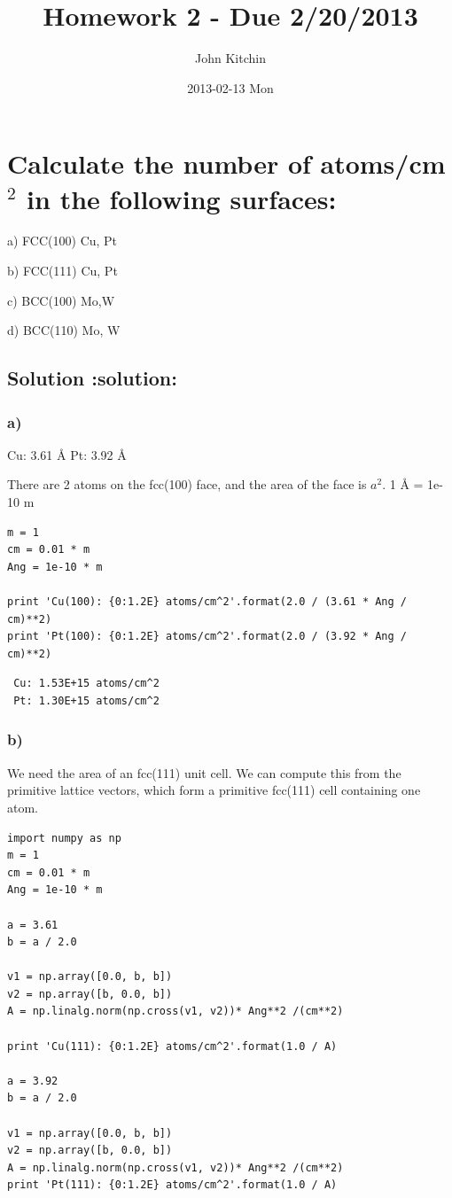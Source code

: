 \documentclass{article}
\title{Homework 2 - Due 2/20/2013}
\author{John Kitchin}
\date{2013-02-13 Mon}
\begin{document}
\maketitle


\section{Calculate the number of atoms/cm$^{2}$ in the following surfaces:}
\label{sec-1}


a) FCC(100) Cu, Pt

b) FCC(111) Cu, Pt

c) BCC(100) Mo,W

d) BCC(110) Mo, W
\subsection{Solution \textbf{:solution:}}
\label{sec-1-1}
\subsubsection{a)}
\label{sec-1-1-1}

Cu: 3.61 \AA{}
Pt: 3.92 \AA{}

There are 2 atoms on the fcc(100) face, and the area of the face is $a^2$. 1 \AA{} = 1e-10 m


\begin{verbatim}
m = 1
cm = 0.01 * m
Ang = 1e-10 * m 

print 'Cu(100): {0:1.2E} atoms/cm^2'.format(2.0 / (3.61 * Ang / cm)**2)
print 'Pt(100): {0:1.2E} atoms/cm^2'.format(2.0 / (3.92 * Ang / cm)**2)
\end{verbatim}

\begin{verbatim}
 Cu: 1.53E+15 atoms/cm^2
 Pt: 1.30E+15 atoms/cm^2
\end{verbatim}
\subsubsection{b)}
\label{sec-1-1-2}

We need the area of an fcc(111) unit cell. We can compute this from the primitive lattice vectors, which form a primitive fcc(111) cell containing one atom.


\begin{verbatim}
import numpy as np
m = 1
cm = 0.01 * m
Ang = 1e-10 * m 

a = 3.61
b = a / 2.0

v1 = np.array([0.0, b, b])
v2 = np.array([b, 0.0, b])
A = np.linalg.norm(np.cross(v1, v2))* Ang**2 /(cm**2)

print 'Cu(111): {0:1.2E} atoms/cm^2'.format(1.0 / A)

a = 3.92
b = a / 2.0

v1 = np.array([0.0, b, b])
v2 = np.array([b, 0.0, b])
A = np.linalg.norm(np.cross(v1, v2))* Ang**2 /(cm**2)
print 'Pt(111): {0:1.2E} atoms/cm^2'.format(1.0 / A)
\end{verbatim}
\end{document}
